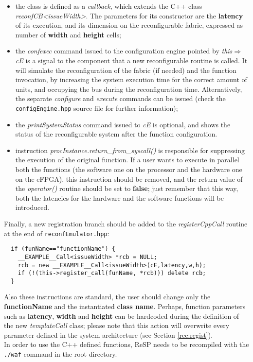 \begin{itemize}
  \item the class is defined as a \textit{callback}, which extends the C++ class \linebreak \mbox{\textit{reconfCB\textless issueWidth\textgreater}}. The parameters for its constructor are the \textbf{latency} of its execution, and its dimension on the reconfigurable fabric, expressed as number of \textbf{width} and \textbf{height} cells;
  \item the \textit{confexec} command issued to the configuration engine pointed by \textit{this$\Rightarrow$cE} is a signal to the component that a new reconfigurable routine is called. It will simulate the reconfiguration of the fabric (if needed) and the function invocation, by increasing the system execution time for the correct amount of units, and occupying the bus during the reconfiguration time. Alternatively, the separate \textit{configure} and \textit{execute} commands can be issued (check the \verb|configEngine.hpp| source file for further information);
  \item the \textit{printSystemStatus} command issued to \textit{cE} is optional, and shows the status of the reconfigurable system after the function configuration.
  \item instruction \textit{procInstance.return\_from\_syscall()} is responsible for suppressing the execution of the original function. If a user wants to execute in parallel both the functions (the software one on the processor and the hardware one on the eFPGA), this instruction should be removed, and the return value of the \textit{operator()} routine should be set to \textbf{false}; just remember that this way, both the latencies for the hardware and the software functions will be introduced.
\end{itemize}

\indent Finally, a new registration branch should be added to the \textit{registerCppCall} routine at the end of \verb|reconfEmulator.hpp|:

\scriptsize
\begin{verbatim}
  if (funName=="functionName") {
    __EXAMPLE__Call<issueWidth> *rcb = NULL;
    rcb = new __EXAMPLE__Call<issueWidth>(cE,latency,w,h);
    if (!(this->register_call(funName, *rcb))) delete rcb;
  }
\end{verbatim}
\normalsize

Also these instructions are standard, the user should change only the \linebreak \mbox{\textbf{functionName}} and the instantiated \textbf{class name}. Perhaps, function parameters such as \textbf{latency}, \textbf{width} and \textbf{height} can be hardcoded during the definition of the new \textit{templateCall} class; please note that this action will overwrite every parameter defined in the system architecture (see Section \ref{rec:regist}).\\
\indent In order to use the C++ defined functions, ReSP needs to be recompiled with the \verb|./waf| command in the root directory.

